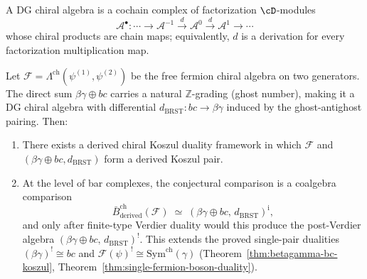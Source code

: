 \begin{definition}
A DG chiral algebra is a cochain complex of factorization
$\cD$-modules
\[
\mathcal{A}^{\bullet}: \cdots \to
\mathcal{A}^{-1} \xrightarrow{d} \mathcal{A}^0
\xrightarrow{d} \mathcal{A}^1 \to \cdots
\]
whose chiral products are chain maps; equivalently, $d$ is a derivation
for every factorization multiplication map.
\end{definition}

\begin{conjecture}\label{conj:derived-bc-betagamma}
Let $\mathcal{F} = \Lambda^{\mathrm{ch}}(\psi^{(1)}, \psi^{(2)})$ be the
free fermion chiral algebra on two generators. The direct sum
$\beta\gamma \oplus bc$ carries a natural $\mathbb{Z}$-grading
(ghost number), making it a DG chiral algebra with differential
$d_{\mathrm{BRST}} \colon bc \to \beta\gamma$ induced by the
ghost-antighost pairing. Then:
\begin{enumerate}
\item There exists a derived chiral Koszul duality framework in which
 $\mathcal{F}$ and $(\beta\gamma \oplus bc, d_{\mathrm{BRST}})$
 form a derived Koszul pair.
\item At the level of bar complexes, the conjectural comparison is a
 coalgebra comparison
 \[
 \bar{B}^{\mathrm{ch}}_{\mathrm{derived}}(\mathcal{F})
 \;\simeq\;
 (\beta\gamma \oplus bc,\, d_{\mathrm{BRST}})^{\mathrm i},
 \]
 and only after finite-type Verdier duality would this produce the
 post-Verdier algebra
 $(\beta\gamma \oplus bc,\, d_{\mathrm{BRST}})^!$. This extends the
 proved single-pair dualities
 $(\beta\gamma)^! \cong bc$ and $\mathcal{F}(\psi)^! \cong
 \mathrm{Sym}^{\mathrm{ch}}(\gamma)$
 (Theorem~\ref{thm:betagamma-bc-koszul},
 Theorem~\ref{thm:single-fermion-boson-duality}).
\end{enumerate}
\end{conjecture}

